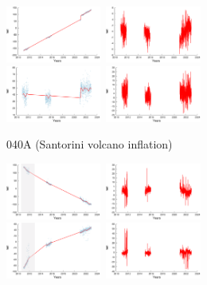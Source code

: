 \documentclass[landscape,a0paper,fontscale=0.346]{baposter} %
\begin{document}
\begin{poster}
{\begin{minipage}[c]{0.33\linewidth}
  \includegraphics[height=5em]{057a_1_data.png}~\includegraphics[height=5em]{057a_1_res.png}\\
  \includegraphics[height=5em]{057a_2_data.png}~\includegraphics[height=5em]{057a_2_res.png}
\end{minipage}
\begin{minipage}[c]{0.33\linewidth}
\begin{center}
  040A (Santorini volcano inflation)
\end{center}
  \includegraphics[height=5em]{048a_0_data.png}~\includegraphics[height=5em]{048a_0_res.png}\\
  \includegraphics[height=5em]{048a_1_data.png}~\includegraphics[height=5em]{048a_1_res.png}\\

\end{minipage}}
\end{poster}
\end{document}
